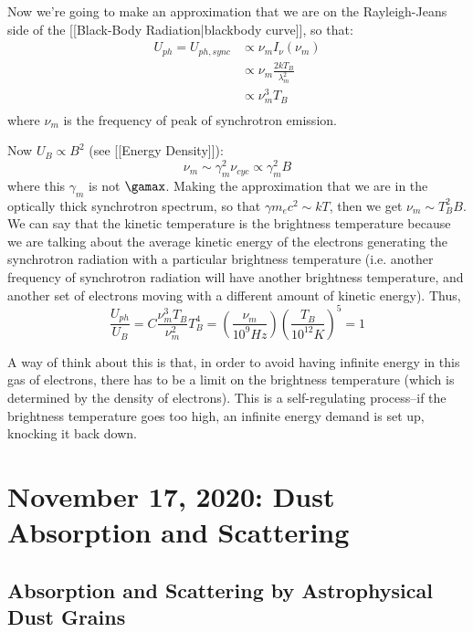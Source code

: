 \documentclass{article}
\begin{document}
Now we're going to make an approximation that we are on the Rayleigh-Jeans
side of the [[Black-Body Radiation|blackbody curve]], so that:
$$\begin{aligned}U_{ph}=U_{ph,sync}&\propto\nu_mI_\nu(\nu_m)\\ 
&\propto\nu_m\frac{2kT_B}{\lambda_m^2}\\ 
&\propto\nu_m^3T_B\\ \end{aligned}$$
where $\nu_m$ is the frequency of peak of synchrotron emission. 

Now $U_B\propto B^2$ (see [[Energy Density]]):  
$$\nu_m\sim\gamma_m^2\nu_{cyc}\propto\gamma_m^2B$$
where this $\gamma_m$ is not $\gamax$.  Making the approximation that we
are in the optically thick synchrotron spectrum, so that $\gamma m_ec^2\sim
kT$, then we get $\nu_m\sim T_B^2B$.  We can say that the kinetic temperature
is the brightness temperature because we are talking about the average kinetic
energy of the electrons generating the synchrotron radiation with a particular
brightness temperature (i.e. another frequency of synchrotron radiation will
have another brightness temperature, and another set of electrons moving
with a different amount of kinetic energy). Thus,
$$\frac{U_{ph}}{ U_B}=C\frac{\nu_m^3T_B}{\nu_m^2}T_B^4
=\left(\frac{\nu_m}{10^9Hz}\right)\left(\frac{T_B}{10^{12}K}\right)^5=1$$

A way of think about this is that, in order to avoid having infinite energy
in this gas of electrons, there has to be a limit on the brightness 
temperature (which is determined by the density of electrons).  This is a
self-regulating process--if the brightness temperature goes too high, an
infinite energy demand is set up, knocking it back down.

\newpage
\section{November 17, 2020: Dust Absorption and Scattering}

\subsection{Absorption and Scattering by Astrophysical Dust Grains}
\end{document}
